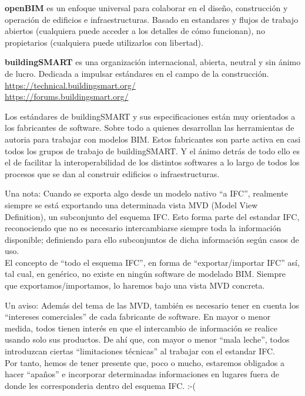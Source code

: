 \documentclass[spanish,10pt,a4paper,final,oneside]{article}
\begin{document}
\textbf{openBIM} es un enfoque universal para colaborar en el diseño, construcción y operación de edificios e infraestructuras. Basado en estandares y flujos de trabajo abiertos (cualquiera puede acceder a los detalles de cómo funcionan), no propietarios (cualquiera puede utilizarlos con libertad).

\textbf{buildingSMART} es una organización internacional, abierta, neutral y sin ánimo de lucro. Dedicada a impulsar estándares en el campo de la construcción.
\\ \url{https://technical.buildingsmart.org/}
\\ \url{https://forums.buildingsmart.org/}

Los estándares de buildingSMART y sus especificaciones están muy orientados a los fabricantes de software. Sobre todo a quienes desarrollan las herramientas de autoria para trabajar con modelos BIM. Estos fabricantes son parte activa en casi todos los grupos de trabajo de buildingSMART. Y el ánimo detrás de todo ello es el de facilitar la interoperabilidad de los distintos softwares a lo largo de todos los procesos que se dan al construir edificios o infraestructuras. 

Una nota: Cuando se exporta algo desde un modelo nativo ``a IFC'', realmente siempre se está exportando una determinada vista MVD (Model View Definition), un subconjunto del esquema IFC. Esto forma parte del estandar IFC, reconociendo que no es necesario intercambiarse siempre toda la información disponible; definiendo para ello subconjuntos de dicha información según casos de uso.
\\El concepto de ``todo el esquema IFC'', en forma de ``exportar/importar IFC'' así, tal cual, en genérico, no existe en ningún software de modelado BIM. Siempre que exportamos/importamos, lo haremos bajo una vista MVD concreta.

Un aviso: Además del tema de las MVD, también es necesario tener en cuenta los ``intereses comerciales'' de cada fabricante de software. En mayor o menor medida, todos tienen interés en que el intercambio de información se realice usando solo sus productos. De ahí que, con mayor o menor ``mala leche'', todos introduzcan ciertas ``limitaciones técnicas'' al trabajar con el estandar IFC. \\Por tanto, hemos de tener presente que, poco o mucho, estaremos obligados a hacer ``apaños'' e incorporar determinadas informaciones en lugares fuera de donde les corresponderia dentro del esquema IFC.  :-(
\end{document}
